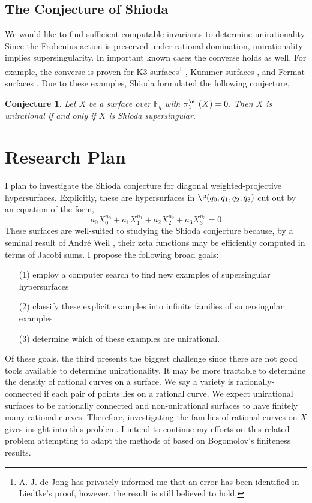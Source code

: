 \documentclass[12pt]{amsart}
\newtheorem*{conj}{Conjecture}
\begin{document}
\subsection*{The Conjecture of Shioda}

We would like to find sufficient computable invariants to determine unirationality. Since the Frobenius action is preserved under rational domination, unirationality implies supersingularity. In important known cases the converse holds as well. For example, the converse is proven for K3 surfaces\footnote{A. J. de Jong has privately informed me that an error has been identified in Liedtke's proof, however, the result is still believed to hold.} \cite{liedtke}, Kummer surfaces \cite{shioda_some_results},  and Fermat surfaces \cite{shioda_on_fermat}. Due to these examples, Shioda formulated \cite{shioda_some_results} the following conjecture,
\begin{conj}
Let $X$ be a surface over $\mathbb{F}_q$ with $\pi_1^{\et}(X) = 0$. Then $X$ is unirational if and only if $X$ is Shioda supersingular.
\end{conj}

\section*{Research Plan}

I plan to investigate the Shioda conjecture for diagonal weighted-projective hypersurfaces. Explicitly, these are hypersurfaces in $\P(q_0, q_1, q_2, q_3)$ cut out by an equation of the form,
\[ a_0 X_0^{n_0} + a_1 X_1^{n_1} + a_2 X_2^{n_2} + a_3 X_3^{n_3} = 0 \]
These surfaces are well-suited to studying the Shioda conjecture because, by a seminal result of Andr\'{e} Weil \cite{weil_counting}, their zeta functions may be efficiently computed in terms of Jacobi sums. I propose the following broad goals:
\begin{enumerate}
\item[(1)] employ a computer search to find new examples of supersingular hypersurfaces
\item[(2)] classify these explicit examples into infinite families of supersingular examples
\item[(3)] determine which of these examples are unirational.
\end{enumerate}
Of these goals, the third presents the biggest challenge since there are not good tools available to determine unirationality. It may be more tractable to determine the density of rational curves on a surface. We say a variety is rationally-connected if each pair of points lies on a rational curve. We expect unirational surfaces to be rationally connected and non-unirational surfaces to have finitely many rational curves. Therefore, investigating the families of rational curves on $X$ gives insight into this problem. I intend to continue my efforts on this related problem attempting to adapt the methods of \cite{lang} based on Bogomolov's finiteness results.
\end{document}
